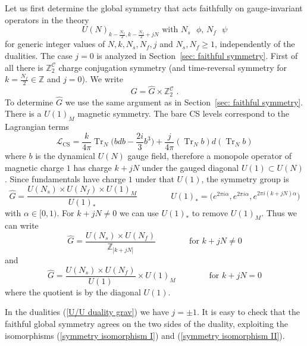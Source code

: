 \documentclass[a4paper, 12pt]{article}
\newcommand{\wh}{\widehat}
\numberwithin{equation}{section}
\newcommand{\be}{\begin{equation}} \newcommand{\ee}{\end{equation}}
\newcommand{\cC}{\mathcal{C}}
\newcommand{\cL}{\mathcal{L}}
\newcommand{\bZ}{\mathbb{Z}}
\DeclareMathOperator{\Tr}{Tr}
\begin{document}
Let us first determine the global symmetry that acts faithfully on gauge-invariant operators in the theory
\be
U(N)_{k - \frac{N_f}2, k - \frac{N_f}2 + j N} \text{ with $N_s$ $\phi$, $N_f$ $\psi$}
\ee
for generic integer values of $N, k, N_s, N_f, j$ and $N_s, N_f \geq 1$, independently of the dualities. The case $j=0$ is analyzed in Section~\ref{sec: faithful symmetry}. First of all there is $\bZ_2^\cC$ charge conjugation symmetry (and time-reversal symmetry for $k = \frac{N_f}2 \in \bZ$ and $j=0$). We write
\be
G = \wh G \times \bZ_2^\cC \;.
\ee
To determine $\wh G$ we use the same argument as in Section~\ref{sec: faithful symmetry}. There is a $U(1)_M$ magnetic symmetry. The bare CS levels correspond to the Lagrangian terms
\be
\cL_\text{CS} = \frac k{4\pi} \Tr_N \Big( bdb - \frac{2i}3 b^3 \Big) + \frac j{4\pi} (\Tr_N b) d (\Tr_N b)
\ee
where $b$ is the dynamical $U(N)$ gauge field, therefore a monopole operator of magnetic charge $1$ has charge $k + jN$ under the gauged diagonal $U(1) \subset U(N)$. Since fundamentals have charge $1$ under that $U(1)$, the symmetry group is
\be
\wh G = \frac{U(N_s) \times U(N_f) \times U(1)_M}{U(1)_*} \qquad\qquad U(1)_* = \big( e^{2\pi i \alpha}, e^{2\pi i \alpha}, e^{2\pi i(k + jN)\alpha} \big)
\ee
with $\alpha \in [0,1)$. For $k + jN \neq 0$ we can use $U(1)_*$ to remove $U(1)_M$. Thus we can write
\be
\wh G = \frac{U(N_s) \times U(N_f)}{\bZ_{|k + jN|}} \qquad\qquad\text{for $k+jN \neq 0$}
\ee
and
\be
\wh G = \frac{U(N_s) \times U(N_f)}{U(1)} \times U(1)_M \qquad\qquad\text{for $k+jN=0$}
\ee
where the quotient is by the diagonal $U(1)$.

In the dualities (\ref{U/U duality grav}) we have $j= \pm1$. It is easy to check that the faithful global symmetry agrees on the two sides of the duality, exploiting the isomorphisms (\ref{symmetry isomorphism I}) and (\ref{symmetry isomorphism II}).
\end{document}
